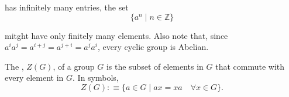 has infinitely many entries, the set
\begin{equation}
  \{ a^{n} \mid n \in \mathbb{Z} \}
\end{equation}

mitght have only finitely many elements. Also note that, since $a^ia^j=a^{i+j}=a^{j+i}=a^ja^i$, every cyclic group is Abelian.

\begin{mydef}
  The , $Z(G)$, of a group $G$ is the subset of elements in $G$ that commute with every element in $G$. In symbols,
  \begin{equation}
    Z(G) :\equiv \{a \in G \mid ax = xa \quad \forall x \in G \}.
  \end{equation}

\end{mydef}